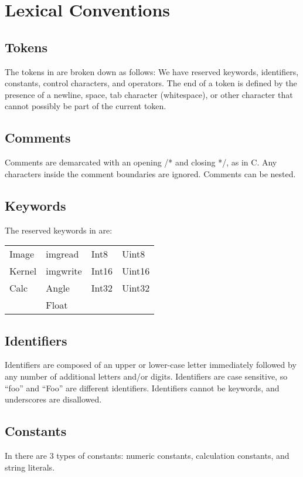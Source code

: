 \section{Lexical Conventions}
\label{sec:lex}

\subsection{Tokens}
\label{ssec:tokens}
The tokens in \sys{} are broken down as follows: We have reserved
keywords, identifiers, constants, control characters, and operators.
The end of a token is defined by the presence of a newline, space,
tab character (whitespace), or other character that
cannot possibly be part of the current token.

\subsection{Comments}
\label{ssec:comments}
Comments are demarcated with an opening /* and closing */, as in C.
Any characters inside the comment boundaries are ignored. Comments
can be nested.

\subsection{Keywords}
\label{ssec:keywords}
The reserved keywords in \sys{} are:
\begin{center}\begin{tabular}{l l l l}
Image & imgread & Int8 & Uint8\\
Kernel & imgwrite & Int16 & Uint16\\
Calc & Angle & Int32 & Uint32\\
 & Float & &
\end{tabular}\end{center}

\subsection{Identifiers}
\label{ssec:identifiers}
Identifiers are composed of an upper or lower-case letter immediately
followed by any number of additional letters and/or digits. Identifiers
are case sensitive, so ``foo'' and ``Foo'' are different identifiers.
Identifiers cannot be keywords, and underscores are disallowed.

\subsection{Constants}
\label{ssec:constants}
In \sys{} there are 3 types of constants: numeric constants,
calculation constants, and string literals.

